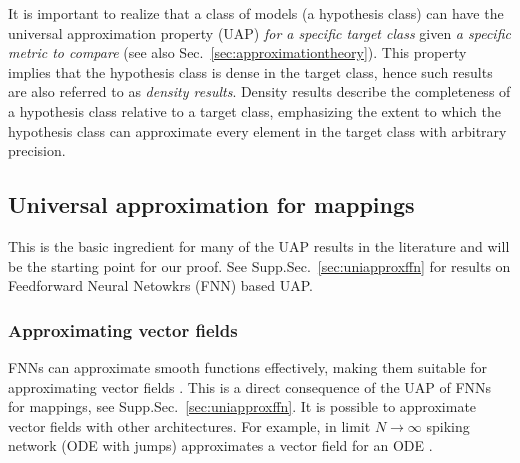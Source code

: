 \documentclass{article}
\newcounter{ct}
\begin{document}
It is important to realize that a class of models (a hypothesis class) can have the universal approximation property (UAP) \emph{for a specific target class} given \emph{a specific metric to compare} (see also Sec.~\ref{sec:approximationtheory}).
This property implies that the hypothesis class is dense in the target class, hence such results are also referred to as \emph{density results}.
Density results describe the completeness of a hypothesis class relative to a target class, emphasizing the extent to which the hypothesis class can approximate every element in the target class with arbitrary precision.


 


\subsection{Universal approximation for mappings}\label{sec:uapmappings}
This is the basic ingredient for many of the UAP results in the literature and will be the starting point for our proof.
See Supp.Sec.~\ref{sec:uniapproxffn} for results on Feedforward Neural Netowkrs (FNN) based UAP.


\subsubsection{Approximating vector fields}\label{sec:uapvfs}
 FNNs can approximate smooth functions effectively, making them suitable for approximating vector fields  \citep{doya1993universality}.
This is a direct consequence of the UAP of FNNs for mappings, see Supp.Sec.~\ref{sec:uniapproxffn}.
%
It is possible to approximate vector fields with other architectures.
For example, in limit $N\rightarrow\infty$ spiking network (ODE with jumps) approximates a vector field for an ODE \citep{podlaski2024approximating}. 
\end{document}
